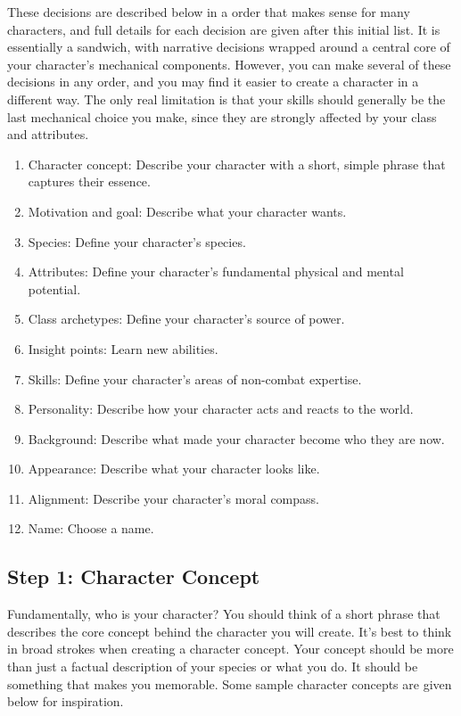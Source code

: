   These decisions are described below in a order that makes sense for many characters, and full details for each decision are given after this initial list.
  It is essentially a sandwich, with narrative decisions wrapped around a central core of your character's mechanical components.
  However, you can make several of these decisions in any order, and you may find it easier to create a character in a different way.
  The only real limitation is that your skills should generally be the last mechanical choice you make, since they are strongly affected by your class and attributes.

  \begin{enumerate}
    \item Character concept: Describe your character with a short, simple phrase that captures their essence.
    \item Motivation and goal: Describe what your character wants.

    \item Species: Define your character's species.
    \item Attributes: Define your character's fundamental physical and mental potential.
    \item Class archetypes: Define your character's source of power.
    \item Insight points: Learn new abilities.
    \item Skills: Define your character's areas of non-combat expertise.

    \item Personality: Describe how your character acts and reacts to the world.
    \item Background: Describe what made your character become who they are now.
    \item Appearance: Describe what your character looks like.
    \item Alignment: Describe your character's moral compass.
    \item Name: Choose a name.
  \end{enumerate}

  \subsection{Step 1: Character Concept}

    Fundamentally, who is your character?
    You should think of a short phrase that describes the core concept behind the character you will create.
    It's best to think in broad strokes when creating a character concept.
    Your concept should be more than just a factual description of your species or what you do.
    It should be something that makes you memorable.
    Some sample character concepts are given below for inspiration.

